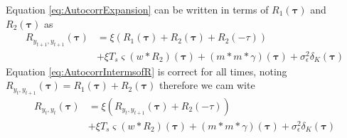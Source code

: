 \documentclass[]{article}
\begin{document}
Equation \ref{eq:AutocorrExpansion} can be written in terms of $R_1\left(\boldsymbol\tau\right)$ and $R_2\left(\boldsymbol\tau\right)$ as
\begin{align}
R_{y_{t+1},y_{t+1}}(\boldsymbol{\tau}) &=\xi \left(R_1\left(\boldsymbol\tau\right)+ R_2\left(\boldsymbol\tau\right)+R_2\left(\boldsymbol-\tau\right)\right) \nonumber \\
&+\xi T_s \varsigma\left(w\ast R_2\right)\left(\boldsymbol\tau\right)+\left(m\ast m \ast \gamma\right)\left(\boldsymbol\tau\right)+\sigma_{\epsilon}^2\delta_{K}\left(\boldsymbol\tau\right)\label{eq:AutocorrIntermsofR}
\end{align}
Equation \ref{eq:AutocorrIntermsofR} is correct for all times, noting $R_{y_{t},y_{t+1}}(\boldsymbol{\tau})=R_1\left(\boldsymbol\tau\right)+ R_2\left(\boldsymbol\tau\right) $ therefore we cam wite
\begin{align}
R_{y_{t},y_{t}}(\boldsymbol{\tau}) &=\xi \left(R_{y_{t},y_{t+1}}(\boldsymbol{\tau})+R_2\left(\boldsymbol-\tau\right)\right) \nonumber \\
&+\xi T_s \varsigma\left(w\ast R_2\right)\left(\boldsymbol\tau\right)+\left(m\ast m \ast \gamma\right)\left(\boldsymbol\tau\right)+\sigma_{\epsilon}^2\delta_{K}\left(\boldsymbol\tau\right)
\end{align}
\end{document}
